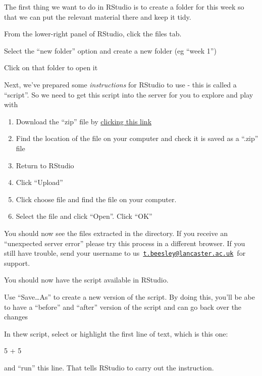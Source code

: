 \documentclass[
]{book}
\newenvironment{Shaded}{\begin{snugshade}}{\end{snugshade}}
\newcommand{\DecValTok}[1]{\textcolor[rgb]{0.00,0.00,0.81}{#1}}
\newcommand{\SpecialCharTok}[1]{\textcolor[rgb]{0.00,0.00,0.00}{#1}}
\begin{document}
The first thing we want to do in RStudio is to create a folder for this week so that we can put the relevant material there and keep it tidy.

From the lower-right panel of RStudio, click the files tab.

Select the ``new folder'' option and create a new folder (eg ``week 1'')

Click on that folder to open it

Next, we've prepared some \emph{instructions} for RStudio to use - this is called a ``script''. So we need to get this script into the server for you to explore and play with

\begin{enumerate}
\def\labelenumi{\arabic{enumi}.}
\item
  Download the ``zip'' file by \href{https://tombeesley.github.io/PSYC121_2022-23/week_1.zip}{clicking this
  link}
\item
  Find the location of the file on your computer and check it is saved
  as a ``.zip'' file
\item
  Return to RStudio
\item
  Click ``Upload''
\item
  Click choose file and find the file on your computer.
\item
  Select the file and click ``Open''. Click ``OK''
\end{enumerate}

You should now see the files extracted in the directory. If you receive an ``unexpected server error'' please try this process in a different
browser. If you still have trouble, send your username to
us~\href{mailto:t.beesley@lancaster.ac.uk}{\nolinkurl{t.beesley@lancaster.ac.uk}}~for support.

You should now have the script available in RStudio.

Use ``Save\ldots As'' to create a new version of the script. By doing this, you'll be abe to have a ``before'' and ``after'' version of the script and can go back over the changes

In thew script, select or highlight the first line of text, which is this one:

\begin{Shaded}
\begin{Highlighting}[]
\DecValTok{5} \SpecialCharTok{+} \DecValTok{5}
\end{Highlighting}
\end{Shaded}

and ``run'' this line. That tells RStudio to carry out the instruction.
\end{document}
